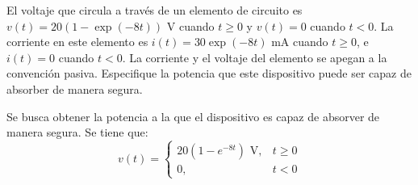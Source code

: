 \documentclass[
  11pt,
  letterpaper,
   addpoints,
  ]{exam}
\begin{document}
\begin{questions}
    \question     
    El voltaje que circula a través de un elemento de circuito es $v(t) = 20(1 - \exp(-8t))$ V cuando $t \geq 0$ y $v(t) = 0$ cuando $t < 0$. La corriente en este elemento es $i(t) = 30\exp(-8t)$ mA cuando $t \geq 0$, e $i(t) = 0$ cuando $t < 0$. La corriente y el voltaje del elemento se apegan a la convención pasiva. Especifique la potencia que este dispositivo puede ser capaz de absorber de manera segura.
    \begin{solution}
        Se busca obtener la potencia a la que el dispositivo es capaz de absorver de manera segura. Se tiene que:
        \begin{equation}
            v(t) =
            \begin{cases} 
            20(1 - e^{-8t}) \text{ V}, & t \geq 0 \\ 
            0, & t < 0 
            \end{cases}
            \end{equation}
            

\end{solution}
\end{questions}
\end{document}
